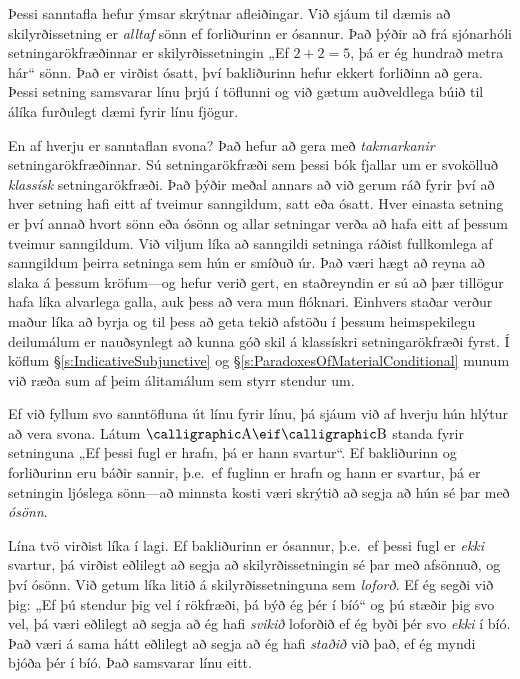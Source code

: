 Þessi sanntafla hefur ýmsar skrýtnar afleiðingar. Við sjáum til dæmis að skilyrðissetning er \emph{alltaf} sönn ef forliðurinn er ósannur. Það þýðir að frá sjónarhóli setningarökfræðinnar er skilyrðissetningin „Ef $2+2=5$, þá er ég hundrað metra hár“ sönn. Það er virðist ósatt, því bakliðurinn hefur ekkert forliðinn að gera. Þessi setning samsvarar línu þrjú í töflunni og við gætum auðveldlega búið til álíka furðulegt dæmi fyrir línu fjögur.

En af hverju er sanntaflan svona? Það hefur að gera með \emph{takmarkanir} setningarökfræðinnar. Sú setningarökfræði sem þessi bók fjallar um er svokölluð \emph{klassísk} setningarökfræði. Það þýðir meðal annars að við gerum ráð fyrir því að hver setning hafi eitt af tveimur sanngildum, satt eða ósatt. Hver einasta setning er því annað hvort sönn eða ósönn og allar setningar verða að hafa eitt af þessum tveimur sanngildum. Við viljum líka að sanngildi setninga ráðist fullkomlega af sanngildum þeirra setninga sem hún er smíðuð úr. Það væri hægt að reyna að slaka á þessum kröfum---og hefur verið gert, en staðreyndin er sú að þær tillögur hafa líka alvarlega galla, auk þess að vera mun flóknari. Einhvers staðar verður maður líka að byrja og til þess að geta tekið afstöðu í þessum heimspekilegu deilumálum er nauðsynlegt að kunna góð skil á klassískri setningarökfræði fyrst. Í köflum \S\ref{s:IndicativeSubjunctive} og \S\ref{s:ParadoxesOfMaterialConditional} munum við ræða sum af þeim álitamálum sem styrr stendur um.

Ef við fyllum svo sanntöfluna út línu fyrir línu, þá sjáum við af hverju hún hlýtur að vera svona. Látum $\meta{A} \eif \meta{B}$ standa fyrir setninguna „Ef þessi fugl er hrafn, þá er hann svartur“. Ef bakliðurinn og forliðurinn eru báðir sannir, þ.e.\ ef fuglinn er hrafn og hann er svartur, þá er setningin ljóslega sönn---að minnsta kosti væri skrýtið að segja að hún sé þar með \emph{ósönn}. 

Lína tvö virðist líka í lagi. Ef bakliðurinn er ósannur, þ.e.\ ef þessi fugl er \emph{ekki} svartur, þá virðist eðlilegt að segja að skilyrðissetningin sé þar með afsönnuð, og því ósönn. Við getum líka litið á skilyrðissetninguna sem \emph{loforð}. Ef ég segði við þig: „Ef þú stendur þig vel í rökfræði, þá býð ég þér í bíó“ og þú stæðir þig svo vel, þá væri eðlilegt að segja að ég hafi \emph{svikið} loforðið ef ég byði þér svo \emph{ekki} í bíó. Það væri á sama hátt eðlilegt að segja að ég hafi \emph{staðið} við það, ef ég myndi bjóða þér í bíó. Það samsvarar línu eitt.

